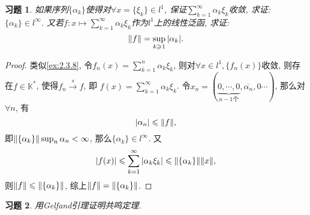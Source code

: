 \documentclass[a4paper,oneside,12pt]{ctexart}
\theoremstyle{plain}
\newtheorem{exercise}{习题}
\theoremstyle{nonumberplain}
\theoremstyle{nonumberplain}
\newtheorem{proof}{证明}
\newcommand{\K}{\mathbb{K}}
\begin{document}
    \begin{exercise}
        \label{ex:2.3.9}
        如果序列$\{\alpha_k\}$使得对$\forall x=\{\xi_k\}\in l^1$, 保证$\sum_{k=1}^\infty\alpha_k\xi_k$收敛, 求证: $\{\alpha_k\}\in l^\infty$. 
        又若$f:x\mapsto\sum_{k=1}^\infty\alpha_k\xi_k$作为$l^1$上的线性泛函, 求证: 
        \begin{equation*}
            \norm{f}=\sup_{k\geqslant 1}\abs{\alpha_k}.
        \end{equation*}
    \end{exercise}

    \begin{proof}
        类似\cref{ex:2.3.8}, 令$f_n(x)=\sum_{k=1}^n\alpha_k\xi_k$, 则对$\forall x\in l^1,\{f_n(x)\}$收敛, 则存在$f\in\K^\ast$, 使得$f_n\overset{s}{\to}f$, 即
        $f(x)=\sum_{k=1}^\infty \alpha_k\xi_k$. 令$x_n=(\underbrace{0,\cdots,0}_{n-1\text{个}},\overline{\alpha_n},0\cdots)$, 那么对$\forall n$, 有 
        \begin{equation*}
            \abs{\alpha_n}\leqslant \norm{f}, 
        \end{equation*}
        即$\norm{\{\alpha_k\}}\sup_n\alpha_n<\infty$, 那么$\{\alpha_k\}\in l^\infty$. 又 
        \begin{equation*}
            \abs{f(x)}\leqslant \sum_{k=1}^\infty\abs{\alpha_k\xi_k}\leqslant \norm{\{\alpha_k\}}\norm{x}, 
        \end{equation*}
        则$\norm{f}\leqslant \norm{\{\alpha_k\}}$, 综上$\norm{f}=\norm{\{\alpha_k\}}$.
    \end{proof}

    \begin{exercise}
        \label{ex:2.3.10}
        用Gelfand引理证明共鸣定理.
    \end{exercise}
\end{document}
